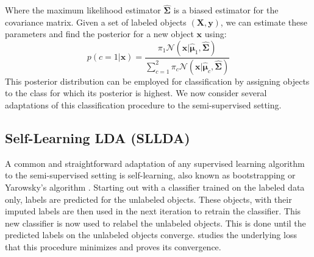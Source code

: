 Where the maximum likelihood estimator $\hat{\mathbf{\Sigma}}$ is a biased estimator for the covariance matrix. Given a set of labeled objects $(\mathbf{X},\mathbf{y})$, we can estimate these parameters and find the posterior for a new object $\mathbf{x}$ using:
\begin{equation}
p(c=1|\mathbf{x})=\frac{\pi_1 \mathcal{N}(\mathbf{x}|\hat{\boldsymbol{\mu}}_1,\hat{\mathbf{\Sigma}})}{\sum_{c=1}^{2} \pi_c \mathcal{N}(\mathbf{x}|\hat{\boldsymbol{\mu}}_c,\hat{\mathbf{\Sigma}})}
\end{equation}
This posterior distribution can be employed for classification by assigning objects to the class for which its posterior is highest. We now consider several adaptations of this classification procedure to the  semi-supervised setting.

\subsection{Self-Learning LDA (SLLDA)}
A common and straightforward adaptation of any supervised learning algorithm to the semi-supervised setting is self-learning, also known as bootstrapping or Yarowsky's algorithm \cite{McLachlan1975,Yarowsky1995}. Starting out with a classifier trained on the labeled data only, labels are  predicted for the unlabeled objects. These objects, with their imputed labels are then used in the next iteration to retrain the classifier. This new classifier is now used to relabel the unlabeled objects. This is done until the predicted labels on the unlabeled objects converge. \cite{Abney2004} studies the underlying loss that this procedure minimizes and proves its convergence.

